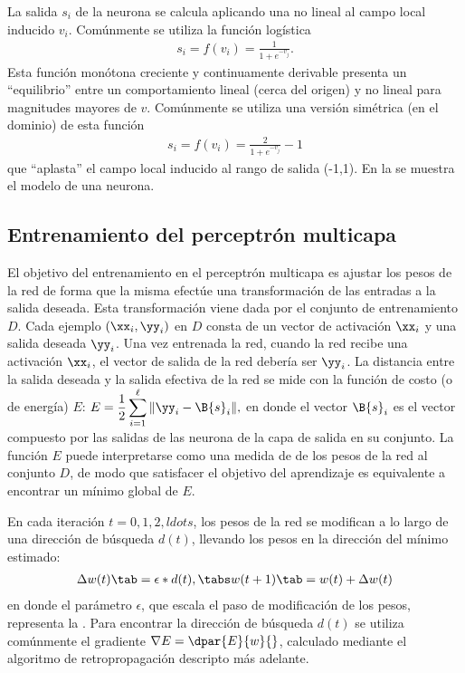 La salida $s_i$ de la neurona se calcula aplicando
una  no lineal al campo local
inducido $v_i$. Comúnmente se utiliza la función logística
%
\begin{align*}
  s_i=f(v_i)=\frac{1}{1+e^{-v_j}}.
\end{align*}
%
Esta función monótona creciente y continuamente derivable presenta un
``equilibrio'' entre un comportamiento lineal (cerca del origen) y no
lineal para magnitudes mayores de $v$. Comúnmente se utiliza una
versión simétrica (en el dominio) de esta función
%
\begin{align*}
  s_i=f(v_i) = \frac{2}{1+e^{-v_j}}-1
\end{align*}
%
que ``aplasta'' el campo local inducido al rango de salida (-1,1).
En la  se muestra el modelo de una neurona.
%
%
\subsection{Entrenamiento del perceptrón multicapa}
%
El objetivo del entrenamiento en el perceptrón multicapa es ajustar
los pesos de la red de forma que la misma efectúe una transformación
de las entradas a la salida deseada. Esta transformación viene dada
por el conjunto de entrenamiento $D$.
Cada ejemplo $(\xx_i,\yy_i)$ en $D$ consta de un vector de activación
$\xx_i$ y una salida deseada $\yy_i$. Una vez entrenada la red, cuando
la red recibe una activación $\xx_i$, el vector de salida de la red
debería ser $\yy_i$. La distancia entre la salida deseada y la salida
efectiva de la red se mide con la función de costo (o de energía) $E$:
$
\begin{align}
  E = \frac{1}{2}\sum_{i=1}^{\ell}\|\yy_i-\B{s}_i\|,
\end{align}
$
en donde el vector $\B{s}_i$ es el vector compuesto por las salidas de
las neurona de la capa de salida en su conjunto.  La función $E$ puede
interpretarse como una medida de  de los pesos de la red al
conjunto $D$, de modo que satisfacer el objetivo del aprendizaje es
equivalente a encontrar un mínimo global de $E$.

En cada iteración $t=0,1,2,ldots$, los pesos de la red
se modifican a lo largo de una dirección de búsqueda
$d(t)$, llevando los pesos en la dirección del mínimo estimado:
%
\begin{align*}
  \Delta w(t) \tab= \epsilon * d(t), \tabs w(t+1) \tab= w(t)+\Delta w(t)
\end{align*}
%
en donde el parámetro $\epsilon$, que escala el paso de modificación
de los pesos, representa la . Para
encontrar la dirección de búsqueda $d(t)$ se utiliza comúnmente el
gradiente $\nabla E = \dpar{E}{w}{}$, calculado mediante el algoritmo de
retropropagación descripto más adelante.

